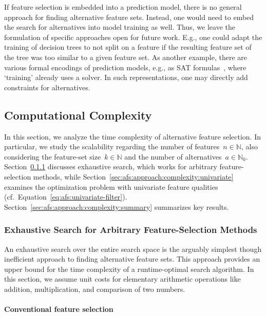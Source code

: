 \documentclass{article}
\theoremstyle{definition}
\begin{document}
If feature selection is embedded into a prediction model, there is no general approach for finding alternative feature sets.
Instead, one would need to embed the search for alternatives into model training as well.
Thus, we leave the formulation of specific approaches open for future work.
E.g., one could adapt the training of decision trees to not split on a feature if the resulting feature set of the tree was too similar to a given feature set.
As another example, there are various formal encodings of prediction models, e.g., as \textsc{SAT} formulas~\cite{narodytska2018learning, schidler2021sat, yu2021learning}, where `training' already uses a solver.
In such representations, one may directly add constraints for alternatives.

\subsection{Computational Complexity}
\label{sec:afs:approach:complexity}

In this section, we analyze the time complexity of alternative feature selection.
In particular, we study the scalability regarding the number of features~$n \in \mathbb{N}$, also considering the feature-set size~$k \in \mathbb{N}$ and the number of alternatives~$a \in \mathbb{N}_0$.
Section~\ref{sec:afs:approach:complexity:exhaustive} discusses exhaustive search, which works for arbitrary feature-selection methods, while Section~\ref{sec:afs:approach:complexity:univariate} examines the optimization problem with univariate feature qualities (cf.~Equation~\ref{eq:afs:univariate-filter}).
Section~\ref{sec:afs:approach:complexity:summary} summarizes key results.

\subsubsection{Exhaustive Search for Arbitrary Feature-Selection Methods}
\label{sec:afs:approach:complexity:exhaustive}

An exhaustive search over the entire search space is the arguably simplest though inefficient approach to finding alternative feature sets.
This approach provides an upper bound for the time complexity of a runtime-optimal search algorithm.
In this section, we assume unit costs for elementary arithmetic operations like addition, multiplication, and comparison of two numbers.

\paragraph{Conventional feature selection}
\end{document}

